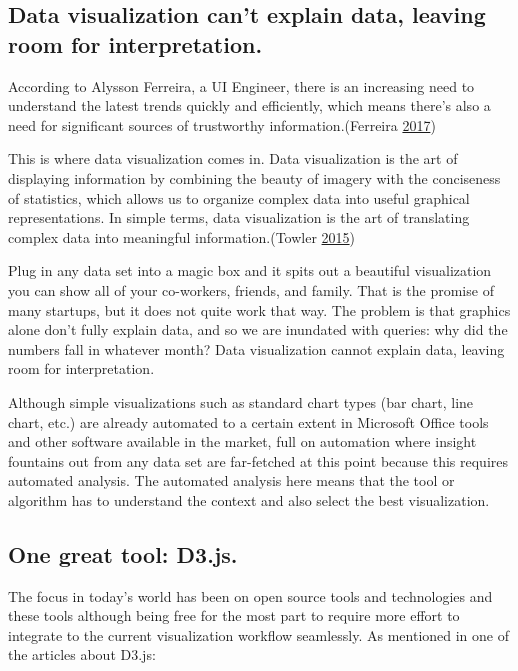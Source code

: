 \documentclass[]{book}
\begin{document}
\hypertarget{data-visualization-cant-explain-data-leaving-room-for-interpretation.}{%
\subsection{Data visualization can't explain data, leaving room for interpretation.}\label{data-visualization-cant-explain-data-leaving-room-for-interpretation.}}

According to Alysson Ferreira, a UI Engineer, there is an increasing need to understand the latest trends quickly and efficiently, which means there's also a need for significant sources of trustworthy information.(Ferreira \protect\hyperlink{ref-UI_engineer}{2017})

This is where data visualization comes in. Data visualization is the art of displaying information by combining the beauty of imagery with the conciseness of statistics, which allows us to organize complex data into useful graphical representations. In simple terms, data visualization is the art of translating complex data into meaningful information.(Towler \protect\hyperlink{ref-future_viz}{2015})

Plug in any data set into a magic box and it spits out a beautiful visualization you can show all of your co-workers, friends, and family. That is the promise of many startups, but it does not quite work that way. The problem is that graphics alone don't fully explain data, and so we are inundated with queries: why did the numbers fall in whatever month? Data visualization cannot explain data, leaving room for interpretation.

Although simple visualizations such as standard chart types (bar chart, line chart, etc.) are already automated to a certain extent in Microsoft Office tools and other software available in the market, full on automation where insight fountains out from any data set are far-fetched at this point because this requires automated analysis. The automated analysis here means that the tool or algorithm has to understand the context and also select the best visualization.

\hypertarget{one-great-tool-d3.js.}{%
\subsection{One great tool: D3.js.}\label{one-great-tool-d3.js.}}

The focus in today's world has been on open source tools and technologies and these tools although being free for the most part to require more effort to integrate to the current visualization workflow seamlessly. As mentioned in one of the articles about D3.js:
\end{document}
